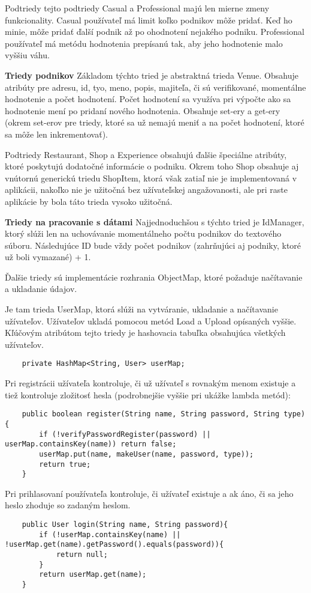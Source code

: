 \documentclass{article}
\begin{document}
Podtriedy tejto podtriedy Casual a Professional majú len mierne zmeny funkcionality. Casual používateľ má limit koľko podnikov môže pridať. Keď ho minie, môže pridať ďalší podnik až po ohodnotení nejakého podniku. Professional používateľ má metódu hodnotenia prepísanú tak, aby jeho hodnotenie malo vyššiu váhu. 

\textbf{Triedy podnikov}
Základom týchto tried je abstraktná trieda Venue. Obsahuje atribúty pre adresu, id, tyo, meno, popis, majiteľa, či sú verifikované, momentálne hodnotenie a počet hodnotení. Počet hodnotení sa využíva pri výpočte ako sa hodnotenie mení po pridaní nového hodnotenia.
Obsahuje set-ery a get-ery (okrem set-erov pre triedy, ktoré sa už nemajú meniť a na počet hodnotení, ktoré sa môže len inkrementovať).

Podtriedy Restaurant, Shop a Experience obsahujú ďalšie špeciálne atribúty, ktoré poskytujú dodatočné informácie o podniku. Okrem toho Shop obsahuje aj vnútornú generickú triedu ShopItem, ktorá však zatiaľ nie je implementovaná v aplikácii, nakoľko nie je užitočná bez užívateľskej angažovanosti, ale pri raste aplikácie by bola táto trieda vysoko užitočná.

\textbf{Triedy na pracovanie s dátami}
Najjednoduchšou s týchto tried je IdManager, ktorý slúži len na uchovávanie momentálneho počtu podnikov do textového súboru. Následujúce ID bude vždy počet podnikov (zahrňujúci aj podniky, ktoré už boli vymazané) + 1.

Ďalšie triedy sú implementácie rozhrania ObjectMap, ktoré požaduje načítavanie a ukladanie údajov.

Je tam trieda UserMap, ktorá slúži na vytváranie, ukladanie a načítavanie užívateľov. Užívateľov ukladá pomocou metód Load a Upload opísaných vyššie.
Kľúčovým atribútom tejto triedy je hashovacia tabuľka obsahujúca všetkých užívateľov.
\begin{verbatim}
    private HashMap<String, User> userMap;
\end{verbatim}
Pri registrácii užívateľa kontroluje, či už užívateľ s rovnakým menom existuje a tiež kontroluje zložitosť hesla (podrobnejšie vyššie pri ukážke lambda metód):
\begin{verbatim}
    public boolean register(String name, String password, String type){
        if (!verifyPasswordRegister(password) || userMap.containsKey(name)) return false;
        userMap.put(name, makeUser(name, password, type));
        return true;
    }
\end{verbatim}
Pri prihlasovaní používateľa kontroluje, či užívateľ existuje a ak áno, či sa jeho heslo zhoduje so zadaným heslom.
\begin{verbatim}
    public User login(String name, String password){
        if (!userMap.containsKey(name) || !userMap.get(name).getPassword().equals(password)){
            return null;
        }
        return userMap.get(name);
    }
\end{verbatim}
\end{document}
